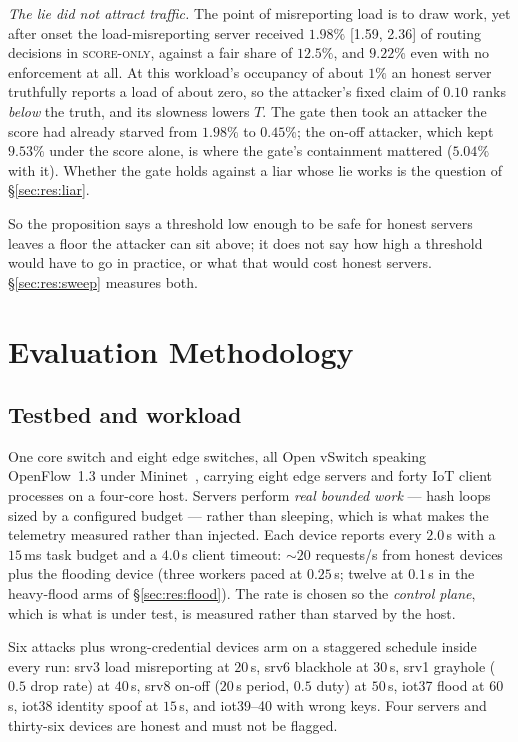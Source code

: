 \documentclass[10pt,twocolumn,letterpaper]{article}
\newcommand{\armscore}{\textsc{score-only}}
\begin{document}
\emph{The lie did not attract traffic.} The point of misreporting load is to
draw work, yet after onset the load-misreporting server received $1.98\%$
[1.59, 2.36] of routing decisions in \armscore{}, against a fair share of
$12.5\%$, and $9.22\%$ even with no enforcement at all. At this workload's
occupancy of about $1\%$ an honest server truthfully reports a load of about
zero, so the attacker's fixed claim of $0.10$ ranks \emph{below} the truth,
and its slowness lowers $T$. The gate then took an attacker the score had
already starved from $1.98\%$ to $0.45\%$; the on-off attacker, which kept
$9.53\%$ under the score alone, is where the gate's containment mattered
($5.04\%$ with it). Whether the gate holds against a liar whose lie works is
the question of \S\ref{sec:res:liar}.

So the proposition says a threshold low enough to be safe for honest servers
leaves a floor the attacker can sit above; it does not say how high a
threshold would have to go in practice, or what that would cost honest servers.
\S\ref{sec:res:sweep} measures both.

\section{Evaluation Methodology}
\label{sec:method}

\subsection{Testbed and workload}
One core switch and eight edge switches, all Open vSwitch speaking
OpenFlow~1.3 under Mininet~\cite{lantz2010mininet}, carrying eight edge servers
and forty IoT client processes on a four-core host. Servers perform \emph{real
bounded work} --- hash loops sized by a configured budget --- rather than
sleeping, which is what makes the telemetry measured rather than injected. Each
device reports every $2.0$\,s with a $15$\,ms task budget and a $4.0$\,s client
timeout: ${\sim}20$ requests/s from honest devices plus the flooding device
(three workers paced at $0.25$\,s; twelve at $0.1$\,s in the heavy-flood arms of
\S\ref{sec:res:flood}). The rate is chosen so the \emph{control plane}, which is
what is under test, is measured rather than starved by the host.

Six attacks plus wrong-credential devices arm on a staggered schedule inside
every run: srv3 load misreporting at $20$\,s, srv6 blackhole at $30$\,s, srv1 grayhole
($0.5$ drop rate) at $40$\,s, srv8 on-off ($20$\,s period, $0.5$ duty) at
$50$\,s, iot37 flood at $60$\,s, iot38 identity spoof at $15$\,s, and iot39--40
with wrong keys. Four servers and thirty-six devices are honest and must not be
flagged.
\end{document}

